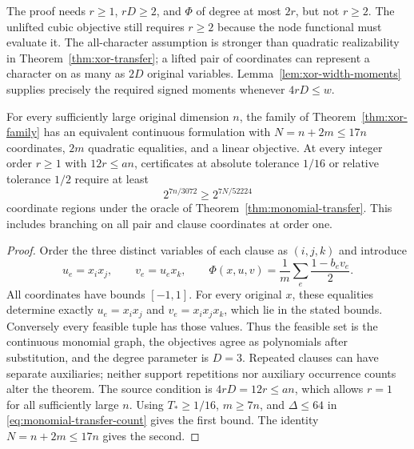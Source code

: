 The proof needs $r\ge1$, $rD\ge2$, and $\Phi$ of degree at most $2r$,
but not $r\ge2$. The unlifted cubic objective still requires $r\ge2$
because the node functional must evaluate it. The all-character assumption is stronger
than quadratic realizability in Theorem~\ref{thm:xor-transfer}; a lifted
pair of coordinates can represent a character on as many as $2D$ original
variables. Lemma~\ref{lem:xor-width-moments} supplies precisely the required
signed moments whenever $4rD\le w$.

\begin{corollary}
\label{cor:xor-quadratic-formulation}
For every sufficiently large original dimension $n$, the family of
Theorem~\ref{thm:xor-family} has an equivalent continuous formulation
with $N=n+2m\le17n$ coordinates, $2m$ quadratic equalities, and a linear
objective. At every integer order $r\ge1$ with $12r\le an$, certificates
at absolute tolerance $1/16$ or relative tolerance $1/2$ require at least
\begin{equation}\label{eq:quadratic-formulation-count}
 2^{7n/3072}\ge2^{7N/52224}
\end{equation}
coordinate regions under the oracle of Theorem~\ref{thm:monomial-transfer}.
This includes branching on all pair and clause coordinates at order one.
\end{corollary}
\begin{proof}
Order the three distinct variables of each clause as $(i,j,k)$ and introduce
\begin{equation}\label{eq:xor-factorable-formulation}
 u_e=x_ix_j,\qquad v_e=u_ex_k,\qquad
 \Phi(x,u,v)=\frac1m\sum_e\frac{1-b_ev_e}{2}.
\end{equation}
All coordinates have bounds $[-1,1]$. For every original $x$, these
equalities determine exactly $u_e=x_ix_j$ and $v_e=x_ix_jx_k$, which lie
in the stated bounds. Conversely every feasible tuple has those values.
Thus the feasible set is the continuous monomial graph, the objectives
agree as polynomials after substitution, and the degree parameter is
$D=3$. Repeated clauses can have separate auxiliaries; neither support
repetitions nor auxiliary occurrence counts alter the theorem. The source
condition is $4rD=12r\le an$, which allows $r=1$ for all sufficiently
large $n$. Using $T_*\ge1/16$, $m\ge7n$, and $\Delta\le64$ in
\eqref{eq:monomial-transfer-count} gives the first bound. The identity
$N=n+2m\le17n$ gives the second.
\end{proof}


